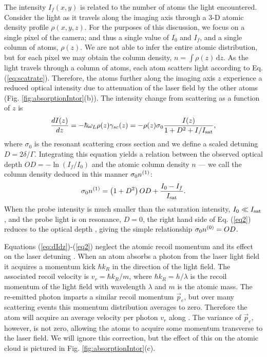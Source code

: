 \documentclass[12pt]{iopart}
\begin{document}
The intensity $I_f(x,y)$ is related to the number of atoms the light encountered. Consider the light as it travels along the imaging axis \ez{} through a 3-D atomic density profile $\rho(x,y,z)$. For the purposes of this discussion, we focus on a single pixel of the camera; and thus a single value of $I_0$ and $I_f$, and a single column of atoms, $\rho(z)$. We are not able to infer the entire atomic distribution, but for each pixel we may obtain the column density, $n = \int \rho\left(z\right) \,\mathrm{d}z$. As the light travels through a column of atoms, each atom scatters light according to Eq. (\ref{eq:scatrate}). Therefore, the atoms further along the imaging axis $z$ experience a reduced optical intensity due to attenuation of the laser field by the other atoms (Fig. \ref{fig:absorptionIntor}(b)). The intensity change from scattering as a function of $z$ is
\begin{equation}
\frac{dI(z)}{dz}=-\hbar\omega_L\rho(z)\gamma_{sc}(z)=-\rho(z)\sigma_0\frac{I(z)}{1+D^2 +I/I_{\rm{sat}}},
\label{eq:dIdz}
\end{equation}
where $\sigma_0$ is the resonant scattering cross section and we define a scaled detuning $D=2\delta/\Gamma$. Integrating this equation yields a relation between the observed optical depth $OD=-\ln \left(I_f/I_0\right)$ and the atomic column density $n$ \cite{Reinaudi07} --- we call the column density deduced in this manner $\sigma_0 n^{\rm{(1)}}$:
\begin{equation}
\sigma_0 n^{\rm{(1)}} = \left(1+D^2\right)OD+ \frac{I_0-I_f}{I_{\rm{sat}}}.
\label{eq2}
\end{equation}
When the probe intensity is much smaller than the saturation intensity, $I_0\ll I_{\rm{sat}}$, and the probe light is on resonance, $D=0$, the right hand side of Eq. (\ref{eq2}) reduces to the optical depth \cite{Reinaudi07}, giving the simple relationship $\sigma_0 n^{\rm{(0)}}=OD$. 
\par Equations (\ref{eq:dIdz})-(\ref{eq2}) neglect the atomic recoil momentum and its effect on the laser detuning \cite{Konstantinidis12}. When an atom absorbs a photon from the laser light field it acquires a momentum kick $\hbar k_R$ in the direction of the light field. The associated recoil velocity is $v_r=\hbar k_R/m$, where $\hbar k_R= h/\lambda$ is the recoil momentum of the light field with wavelength $\lambda$ and $m$ is the atomic mass. The re-emitted photon imparts a similar recoil momentum $\vec{p}_e$, but over many scattering events this momentum distribution averages to zero. Therefore the atom  will acquire an average velocity per photon $v_r$ along \ez{}. The variance of $\vec{p}_e$, however, is not zero, allowing the atoms to acquire some momentum transverse to the laser field. We will ignore this correction, but the effect of this on the atomic cloud is pictured in Fig. \ref{fig:absorptionIntor}(c).
\end{document}
